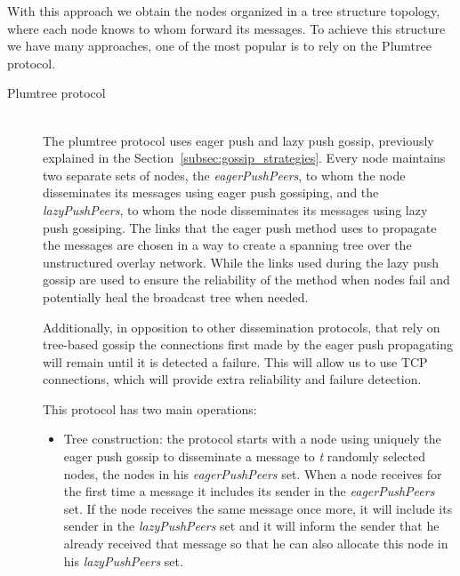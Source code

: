 With this approach we obtain the nodes organized in a tree structure topology, where each node
knows to whom forward its messages. To achieve this structure we have many approaches, one of
the most popular is to rely on the \gls{Plumtree} protocol.
\begin{description}
      \item[Plumtree protocol] \hfill \\
            The plumtree protocol \cite{Leitao2007Tree} uses eager push and lazy push gossip,
            previously explained in the Section~\ref{subsec:gossip_strategies}. Every node
            maintains two separate sets of nodes, the \textit{eagerPushPeers}, to whom the
            node disseminates its messages using eager push gossiping, and the \textit{lazyPushPeers},
            to whom the node disseminates its messages using lazy push gossiping.
            The links that the eager push method uses to propagate the messages are
            chosen in a way to create a spanning tree over the unstructured overlay network.
            While the links used during the lazy push gossip are used to ensure the
            reliability of the method when nodes fail and potentially heal the broadcast tree
            when needed.

            Additionally, in opposition to other dissemination protocols, that rely on
            tree-based gossip the connections first made by the eager push propagating will
            remain until it is detected a failure. This will allow us to use \Gls{TCP}
            connections, which will provide extra reliability and failure detection.

            This protocol has two main operations:
            \begin{itemize}
                  \item Tree construction: the protocol starts with a node using uniquely the
                        eager push gossip to disseminate a message to \textit{t} randomly selected
                        nodes, the nodes in his \textit{eagerPushPeers} set. When a node
                        receives for the first time a message it includes its sender in the
                        \textit{eagerPushPeers} set. If the node receives the same message
                        once more, it will include its sender in the \textit{lazyPushPeers}
                        set and it will inform the sender that he already received that
                        message so that he can also allocate this node in his \textit{lazyPushPeers}
                        set.


\end{itemize}
\end{description}
